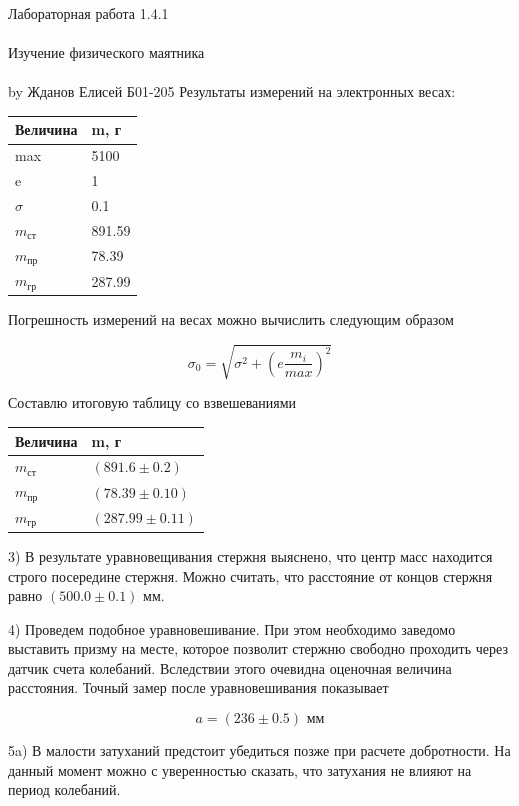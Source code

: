 \documentclass{astroedu-lab}
\begin{document}
\begin{problem}{\huge Лабораторная работа 1.4.1\\\\Изучение физического маятника\\\\by Жданов Елисей Б01-205}
Результаты измерений на электронных весах:

\begin{center}
\begin{tabular}[t]{|l|l|}
\hline
Величина & m, г \\
\hline
max & 5100 \\
e & 1 \\
$\sigma$ & 0.1 \\
$m_{\text{ст}}$ & 891.59 \\
$m_{\text{пр}}$ & 78.39 \\
$m_{\text{гр}}$ & 287.99 \\
\hline
\end{tabular}
\end{center}

Погрешность измерений на весах можно вычислить следующим образом

\begin{equation}
	\sigma_0 = \sqrt{\sigma^2 + \left(e\frac{m_i}{max}\right)^2}
\end{equation}

Составлю итоговую таблицу со взвешеваниями

\begin{center}
\begin{tabular}[t]{|l|l|}
\hline
Величина & m, г \\
\hline
$m_{\text{ст}}$ & $(891.6 \pm 0.2)$ \\
$m_{\text{пр}}$ & $(78.39 \pm 0.10)$ \\
$m_{\text{гр}}$ & $(287.99 \pm 0.11)$ \\
\hline
\end{tabular}
\end{center}

3) В результате уравновещивания стержня выяснено, что центр масс находится строго посередине стержня. Можно считать, что расстояние от концов стержня равно $(500.0 \pm 0.1)$ мм. 

4) Проведем подобное уравновешивание. При этом необходимо заведомо выставить призму на месте, которое позволит стержню свободно проходить через датчик счета колебаний. Вследствии этого очевидна оценочная величина расстояния. Точный замер после уравновешивания показывает

\begin{equation}
	a = (236 \pm 0.5) \text{ мм}
\end{equation}

5a) В малости затуханий предстоит убедиться позже при расчете добротности. На данный момент можно с уверенностью сказать, что затухания не влияют на период колебаний.


\end{problem}
\end{document}
